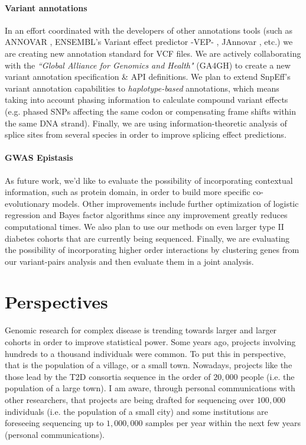 \paragraph{Variant annotations} In an effort coordinated with the developers of other annotations tools (such as ANNOVAR \cite{wang2010annovar}, ENSEMBL’s Variant effect predictor -VEP- \cite{mclaren2010deriving}, JAnnovar \cite{jager2014jannovar}, etc.) we are creating new annotation standard for VCF files. 
We are actively collaborating with the \textit{``Global Alliance for Genomics and Health"} (GA4GH) to create a new variant annotation specification \& API definitions. 
We plan to extend SnpEff's variant annotation capabilities to \textit{haplotype-based} annotations, which means taking into account phasing information to calculate compound variant effects (e.g. phased SNPs affecting the same codon or compensating frame shifts within the same DNA strand). 
Finally, we are using information-theoretic analysis of splice sites from several species in order to improve splicing effect predictions.

\paragraph{GWAS Epistasis}
As future work, we'd like to evaluate the possibility of incorporating contextual information, such as protein domain, in order to build more specific co-evolutionary models. 
Other improvements include further optimization of logistic regression and Bayes factor algorithms since any improvement greatly reduces computational times. 
We also plan to use our methods on even larger type II diabetes cohorts that are currently being sequenced. 
Finally, we are evaluating the possibility of incorporating higher order interactions by clustering genes from our variant-pairs analysis and then evaluate them in a joint analysis.

\section{Perspectives}

Genomic research for complex disease is trending towards larger and larger cohorts in order to improve statistical power. 
Some years ago, projects involving hundreds to a thousand individuals were common. 
To put this in perspective, that is the population of a village, or a small town. 
Nowadays, projects like the those lead by the T2D consortia sequence in the order of $20,000$ people (i.e. the population of a large town). 
I am aware, through personal communications with other researchers, that projects are being drafted for sequencing over $100,000$ individuals (i.e. the population of a small city) and some institutions are foreseeing sequencing up to $1,000,000$ samples per year within the next few years (personal communications). 

